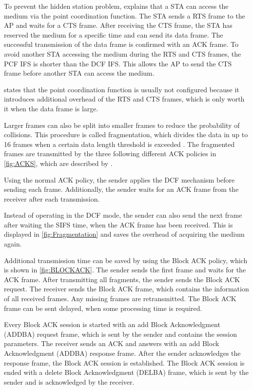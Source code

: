 To prevent the hidden station problem, \textcite{sauter_wireless_2022} explains that a \ac{STA} can access the medium
via the point coordination function.
The \ac{STA} sends a \ac{RTS} frame to the \ac{AP} and waits for a \ac{CTS} frame.
After receiving the \ac{CTS} frame, the \ac{STA} has reserved the medium for a specific time and can send its data frame.
The successful transmission of the data frame is confirmed with an \ac{ACK} frame.
To avoid another \ac{STA} accessing the medium during the \ac{RTS} and \ac{CTS} frames, the \ac{PCF} \ac{IFS} is
shorter than the \ac{DCF} \ac{IFS}.
This allows the \ac{AP} to send the \ac{CTS} frame before another \ac{STA} can access the medium.

\textcite{sauter_wireless_2022} states that the point coordination function is usually not configured because it introduces additional
overhead of the \ac{RTS} and \ac{CTS} frames, which is only worth it when the data frame is large.

Larger frames can also be split into smaller frames to reduce the probability of collisions.
This procedure is called fragmentation, which divides the data in up to \num{16} frames
when a certain data length threshold is exceeded \cite{noauthor_ieee_2021}.
The fragmented frames are transmitted by the three following different \ac{ACK} policies in \autoref{fig:ACKS}, which are described by \textcite{sauter_wireless_2022}.

Using the normal \ac{ACK} policy, the sender applies the \ac{DCF} mechanism before sending each frame.
Additionally, the sender waits
for an \ac{ACK} frame from the receiver after each transmission.

Instead of operating in the \ac{DCF} mode, the sender
can also send the next frame after waiting the \ac{SIFS} time, when the \ac{ACK} frame has been received.
This is displayed in \autoref{fig:Fragmentation} and saves the overhead of acquiring the medium again.

Additional transmission time can be saved by using the Block \ac{ACK} policy, which is shown in \autoref{fig:BLOCKACK}.
The sender sends the first frame and waits for the \ac{ACK} frame.
After transmitting all fragments, the sender sends the Block \ac{ACK} request.
The receiver sends the Block \ac{ACK} frame, which contains the information of all received frames.
Any missing frames are retransmitted.
The Block \ac{ACK} frame can be sent delayed, when some processing time is required.

Every Block \ac{ACK} session is started with an add Block Acknowledgment (ADDBA) request frame, which is sent by the sender and
contains the session parameters. The receiver sends an \ac{ACK} and answers with an add Block Acknowledgment (ADDBA) response frame.
After the sender acknowledges the response frame, the Block \ac{ACK} session is established.
The Block \ac{ACK} session is ended with a delete Block Acknowledgment (DELBA) frame, which is sent by the sender and
is acknowledged by the receiver.

